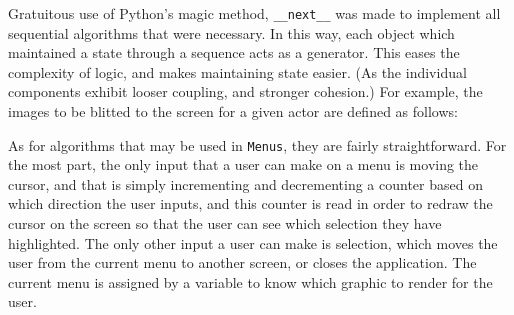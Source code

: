 Gratuitous use of Python's magic method, \texttt{__next__}
was made to implement all sequential algorithms that were necessary.
In this way, each object which maintained a state through a sequence
acts as a generator.  This eases the complexity of logic, and makes
maintaining state easier. (As the individual components exhibit looser
coupling, and stronger cohesion.)  For example, the images to be blitted
to the screen for a given actor are defined as follows:


As for algorithms that may be used in \texttt{Menus}, they
are fairly straightforward. For the most part, the only input that a
user can make on a menu is moving the cursor, and that is simply
incrementing and decrementing a counter based on which direction the
user inputs, and this counter is read in order to redraw the cursor on
the screen so that the user can see which selection they have highlighted.
The only other input a user can make is selection, which moves the user
from the current menu to another screen, or closes the application. The
current menu is assigned by a variable to know which graphic to render for
the user.
